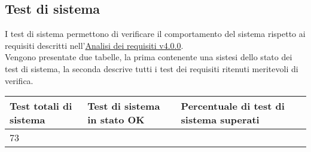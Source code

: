 \documentclass{scalatekids-article}
\begin{document}
\subsection{Test di sistema}

I test di sistema permettono di verificare il comportamento del sistema rispetto ai requisiti descritti nell'\href{run:./AnalisiDeiRequisiti\_v4.0.0.pdf}{Analisi dei requisiti v4.0.0}.\\
Vengono presentate due tabelle, la prima contenente una sistesi dello stato dei 
test di sistema, la seconda descrive tutti i test dei requisiti ritenuti meritevoli di verifica. \\

\begin{center}
  \begin{longtable}[H]{| l | l | l |}
    \hline
    Test totali di sistema & Test di sistema in stato OK & Percentuale di test di sistema superati\\
    \hline
    73 &  & \\ %
    \hline
  \end{longtable}
\end{center}
\end{document}
